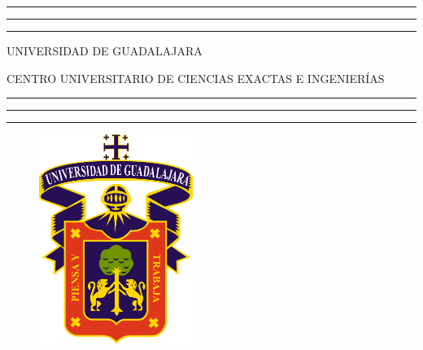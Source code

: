 \documentclass[letterpaper,12pt,oneside]{book}
\begin{document}
	
	\begin{titlepage}

		
		\begin{center}
			
			\noindent
			\hspace{-0.1\textwidth}\rule{1.1\textwidth}{4px}\vspace{-0.08cm}
			
			\hspace{-0.1\textwidth}\rule{1.1\textwidth}{8px}\vspace{-0.23cm}
			
			\hspace{-0.1\textwidth}\rule{1.1\textwidth}{4px}
			
	
			\hspace{-0.125\textwidth}\Huge{UNIVERSIDAD DE GUADALAJARA}
			
			\hspace{-0.125\textwidth}\large{CENTRO UNIVERSITARIO DE CIENCIAS EXACTAS E INGENIERÍAS}
			
			\noindent
			\hspace{-0.1\textwidth}\rule{1.1\textwidth}{4px}\vspace{-0.2cm}
			
			\hspace{-0.1\textwidth}\rule{1.1\textwidth}{8px}\vspace{-0.33cm}
			
			\hspace{-0.1\textwidth}\rule{1.1\textwidth}{4px}
		\end{center}
		
		
		\begin{center}
			
			
			\begin{figure}[h!]
				\centering
				\includegraphics[width=5cm]{Escudo.pdf}
			\end{figure}
		

\end{center}
\end{titlepage}
\end{document}
